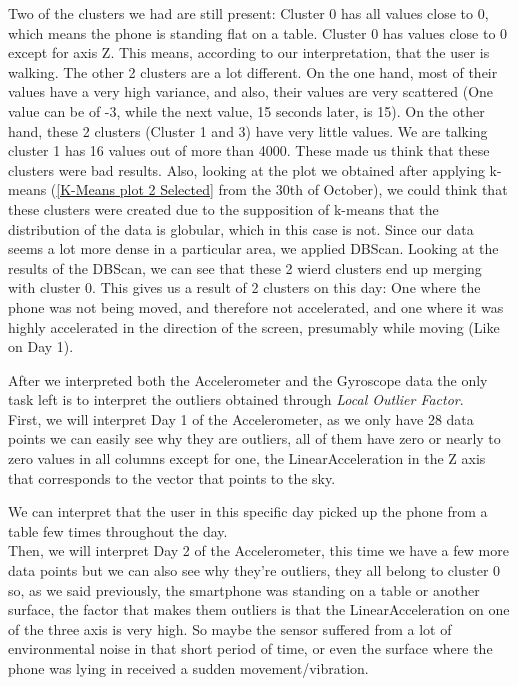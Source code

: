 \documentclass[idxtotoc,hyperref,openany]{labbook} %
\begin{document}
Two of the clusters we had are still present: Cluster 0 has all values close to 0, which means the phone is standing flat on a table. Cluster 0 has values close to 0 except for axis Z. This means, according to our interpretation, that the user is walking. The other 2 clusters are a lot different. On the one hand, most of their values have a very high variance, and also, their values are very scattered (One value can be of -3, while the next value, 15 seconds later, is 15). On the other hand, these 2 clusters (Cluster 1 and 3) have very little values. We are talking cluster 1 has 16 values out of more than 4000. These made us think that these clusters were bad results. Also, looking at the plot we obtained after applying k-means (\ref{K-Means plot 2 Selected} from the 30th of October), we could think that these clusters were created due to the supposition of k-means that the distribution of the data is globular, which in this case is not. Since our data seems a lot more dense in a particular area, we applied DBScan. Looking at the results of the DBScan, we can see that these 2 wierd clusters end up merging with cluster 0. This gives us a result of 2 clusters on this day: One where the phone was not being moved, and therefore not accelerated, and one where it was highly accelerated in the direction of the screen, presumably while moving (Like on Day 1).




After we interpreted both the Accelerometer and the Gyroscope data the only task left is to interpret the outliers obtained through \textit{Local Outlier Factor}.
\\

First, we will interpret Day 1 of the Accelerometer, as we only have 28 data points we can easily see why they are outliers, all of them have zero or nearly to zero values in all columns except for one, the LinearAcceleration in the Z axis that corresponds to the vector that points to the sky.


We can interpret that the user in this specific day picked up the phone from a table few times throughout the day.
\\

Then, we will interpret Day 2 of the Accelerometer, this time we have a few more data points but we can also see why they're outliers, they all belong to cluster 0 so, as we said previously, the smartphone was standing on a table or another surface, the factor that makes them outliers is that the LinearAcceleration on one of the three axis is very high. So maybe the sensor suffered from a lot of environmental noise in that short period of time, or even the surface where the phone was lying in received a sudden movement/vibration.
\\
\end{document}
